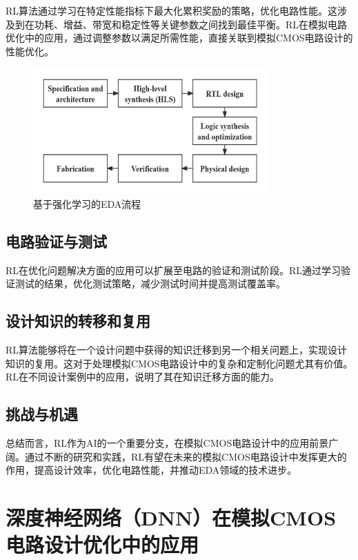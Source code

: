 RL算法通过学习在特定性能指标下最大化累积奖励的策略，优化电路性能。这涉及到在功耗、增益、带宽和稳定性等关键参数之间找到最佳平衡。RL在模拟电路优化中的应用，通过调整参数以满足所需性能，直接关联到模拟CMOS电路设计的性能优化。\cite{8807032}

\begin{figure}[htbp]
    \centering
    \includegraphics[width=0.8\textwidth]{images/figure-2-1-layout-EDA-flow.jpeg}
    \caption{基于强化学习的EDA流程}
    \label{fig:rl-eda-flow}
\end{figure}

\subsection{电路验证与测试}

RL在优化问题解决方面的应用可以扩展至电路的验证和测试阶段。RL通过学习验证测试的结果，优化测试策略，减少测试时间并提高测试覆盖率。\cite{1024449010.nh}

\subsection{设计知识的转移和复用}

RL算法能够将在一个设计问题中获得的知识迁移到另一个相关问题上，实现设计知识的复用。这对于处理模拟CMOS电路设计中的复杂和定制化问题尤其有价值。RL在不同设计案例中的应用，说明了其在知识迁移方面的能力。\cite{6565786}

\subsection{挑战与机遇}

总结而言，RL作为AI的一个重要分支，在模拟CMOS电路设计中的应用前景广阔。通过不断的研究和实践，RL有望在未来的模拟CMOS电路设计中发挥更大的作用，提高设计效率，优化电路性能，并推动EDA领域的技术进步。

\section{深度神经网络（DNN）在模拟CMOS电路设计优化中的应用}

